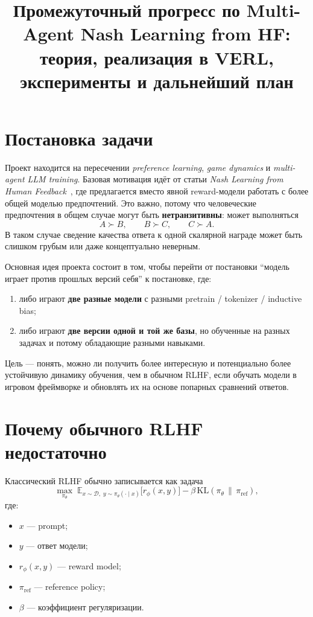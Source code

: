 \documentclass[11pt,a4paper]{article}
\title{Промежуточный прогресс по Multi-Agent Nash Learning from HF:\\
теория, реализация в VERL, эксперименты и дальнейший план}
\author{}
\date{}
\begin{document}
\maketitle

\section{Постановка задачи}

Проект находится на пересечении \textit{preference learning}, \textit{game dynamics} и \textit{multi-agent LLM training}. Базовая мотивация идёт от статьи \textit{Nash Learning from Human Feedback}~\cite{nlhf}, где предлагается вместо явной reward-модели работать с более общей моделью предпочтений. Это важно, потому что человеческие предпочтения в общем случае могут быть \textbf{нетранзитивны}: может выполняться
\[
A \succ B, \qquad B \succ C, \qquad C \succ A.
\]
В таком случае сведение качества ответа к одной скалярной награде может быть слишком грубым или даже концептуально неверным.

Основная идея проекта состоит в том, чтобы перейти от постановки ``модель играет против прошлых версий себя'' к постановке, где:
\begin{enumerate}[label=\arabic*.]
  \item либо играют \textbf{две разные модели} с разными pretrain / tokenizer / inductive bias;
  \item либо играют \textbf{две версии одной и той же базы}, но обученные на разных задачах и потому обладающие разными навыками.
\end{enumerate}

Цель --- понять, можно ли получить более интересную и потенциально более устойчивую динамику обучения, чем в обычном RLHF, если обучать модели в игровом фреймворке и обновлять их на основе попарных сравнений ответов.

\section{Почему обычного RLHF недостаточно}

Классический RLHF обычно записывается как задача
\[
\max_{\pi_\theta}
\;
\mathbb{E}_{x \sim \mathcal D,\; y \sim \pi_\theta(\cdot \mid x)}
\bigl[r_\phi(x,y)\bigr]
- \beta \, \mathrm{KL}(\pi_\theta \,\|\, \pi_{\mathrm{ref}}),
\]
где:
\begin{itemize}
  \item $x$ --- prompt;
  \item $y$ --- ответ модели;
  \item $r_\phi(x,y)$ --- reward model;
  \item $\pi_{\mathrm{ref}}$ --- reference policy;
  \item $\beta$ --- коэффициент регуляризации.
\end{itemize}
\end{document}
